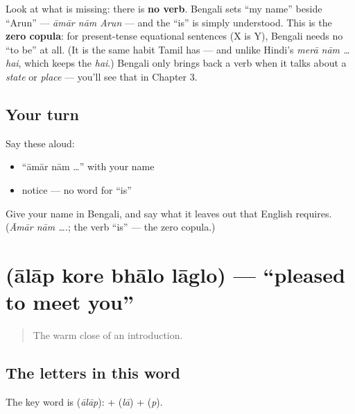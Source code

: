 \begin{grammarlens}[title={Grammar Lens: Bengali drops \textquotedblleft{}is\textquotedblright{} in the present}]
Look at what is missing: there is \textbf{no verb}. Bengali sets \textquotedblleft{}my name\textquotedblright{} beside \textquotedblleft{}Arun\textquotedblright{} — \emph{āmār nām Arun} — and the \textquotedblleft{}is\textquotedblright{} is simply understood. This is the \textbf{zero copula}: for present-tense equational sentences (X is Y), Bengali needs no \textquotedblleft{}to be\textquotedblright{} at all. (It is the same habit Tamil has — and unlike Hindi's \emph{merā nām … hai}, which keeps the \emph{hai}.) Bengali only brings back a verb when it talks about a \emph{state} or \emph{place} — you'll see that in Chapter 3.
\end{grammarlens}

\subsection*{Your turn}
Say these aloud:

\begin{itemize}
\raggedright
  \item \textquotedblleft{}āmār nām …\textquotedblright{} with your name
  \item notice — no word for \textquotedblleft{}is\textquotedblright{}
\end{itemize}

\begin{tcolorbox}[breakable,colback=teal!4,colframe=teal!35!black,title={Before you move on}]
Give your name in Bengali, and say what it leaves out that English requires. (\emph{Āmār nām ….}; the verb \textquotedblleft{}is\textquotedblright{} — the zero copula.)
\end{tcolorbox}
\section[\bn{আলাপ} \bn{করে} \bn{ভালো} \bn{লাগলো}]{    (ālāp kore bhālo lāglo) — \textquotedblleft{}pleased to meet you\textquotedblright{}}

\label{lesson:BN-C02-alaap}



\begin{quote}
The warm close of an introduction.
\end{quote}

\subsection*{The letters in this word}
The key word is \textbf{} (\emph{ālāp}): \textbf{} + \textbf{} (\emph{lā}) + \textbf{} (\emph{p}).

